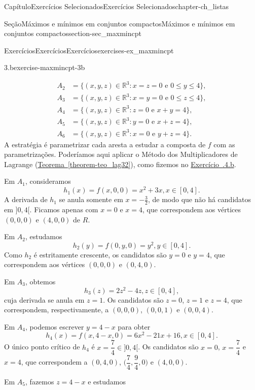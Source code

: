 \documentclass[oneside,10pt,]{book}
\newcommand{\xreffont}{\relax}
\numberwithin{equation}{section}
\newcommand{\R}{\mathbb R}
\begin{document}
\begin{chapterptx}{Capítulo}{Exercícios Selecionados}{}{Exercícios Selecionados}{}{}{chapter-ch_listas}
\begin{sectionptx}{Seção}{Máximos e mínimos em conjuntos compactos}{}{Máximos e mínimos em conjuntos compactos}{}{}{section-sec_maxmincpt}
\begin{exercises-subsection-numberless}{Exercícios}{Exercícios}{}{Exercícios}{}{}{exercises-ex_maxmincpt}
\begin{divisionexercise}{3.b}{}{}{exercise-maxmincpt-3b}
\begin{itemize}[label=\textbullet]
\begin{align*}
A_2 &= \big\{(x,y,z) \in \R^3\colon x=z=0\text{ e }
0 \leq y \leq 4\big\},\\
A_3 &= \big\{(x,y,z) \in \R^3\colon x=y=0\text{ e }
0 \leq z \leq 4\big\},\\
A_4 &= \{(x,y,z) \in \R^3\colon z=0\text{ e }
x+y=4\big\},\\
A_5 &= \{(x,y,z) \in \R^3\colon y=0\text{ e }
x+z=4\big\},\\
A_6 &= \{(x,y,z) \in \R^3\colon x=0\text{ e }
y+z=4\big\}.
\end{align*}
A estratégia é parametrizar cada aresta a estudar a composta de \(f\) com as parametrizações. Poderíamos aqui aplicar o Método dos Multiplicadores de Lagrange (\hyperref[theorem-teo_lag32]{Teorema~{\xreffont\ref{theorem-teo_lag32}}}), como fizemos no \hyperlink{exercise-maxmincpt-4b}{Exercício~{\xreffont 1.11.4.b}}.%
\par
Em \(A_1\), consideramos%
\begin{equation*}
h_1(x) = f(x,0,0) = x^2 + 3x, x \in [0,4].
\end{equation*}
A derivada de \(h_1\) se anula somente em \(x=-\frac{3}{2}\), de modo que não há candidatos em \(]0,4[\). Ficamos apenas com \(x=0\) e \(x=4\), que correspondem aos vértices \((0,0,0)\) e \((4,0,0)\) de \(R\).%
\par
Em \(A_2\), estudamos%
\begin{equation*}
h_2(y) = f(0,y,0) = y^2, y \in [0,4].
\end{equation*}
Como \(h_2\) é estritamente crescente, os candidatos são \(y=0\) e \(y=4\), que correspondem aos vértices \((0,0,0)\) e \((0,4,0)\).%
\par
Em \(A_3\), obtemos%
\begin{equation*}
h_3(z) = 2z^2 -4z, z \in
[0,4],
\end{equation*}
cuja derivada se anula em \(z=1\). Os candidatos são \(z=0\), \(z=1\) e \(z=4\), que correspondem, respectivamente, a \((0,0,0)\), \((0,0,1)\) e \((0,0,4)\).%
\par
Em \(A_4\), podemos escrever \(y=4-x\) para obter%
\begin{equation*}
h_4(x) = f(x,4-x,0) = 6x^2 -21x + 16, x \in [0,4].
\end{equation*}
O único ponto crítico de \(h_4\) é \(x=\dfrac{7}{4} \in
]0,4[\). Os candidatos são \(x=0\), \(x= \dfrac{7}{4}\) e \(x=4\), que correspondem a \((0,4,0)\), \(\Big(\dfrac{7}{4}, \dfrac{9}{4}, 0\Big)\) e \((4, 0,
0)\).%
\par
Em \(A_5\), fazemos \(z=4-x\) e estudamos%
\begin{equation*}

\end{equation*}
\end{itemize}
\end{divisionexercise}
\end{exercises-subsection-numberless}
\end{sectionptx}
\end{chapterptx}
\end{document}
